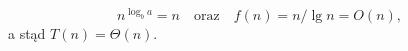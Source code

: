 % 
% 

\subsubsection{} %
\[
	n^{\log_ba}=n\quad\mbox{oraz}\quad f(n)=n/\lg n=O(n),
\]
a stąd $T(n)=\Theta(n)$.

